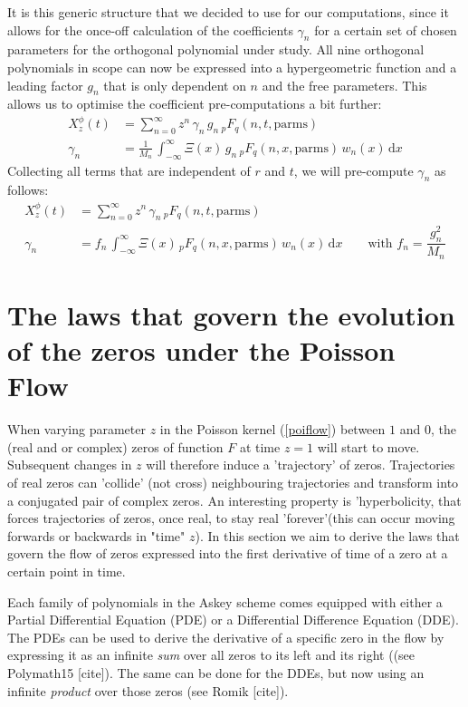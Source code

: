 \documentclass[a4paper,11pt,twoside]{amsart}
\begin{document}
It is this generic structure that we decided to use for our computations, since it allows for the once-off calculation of the coefficients $\gamma_n$ for a certain set of chosen parameters for the orthogonal polynomial under study. All nine orthogonal polynomials in scope can now be expressed into a hypergeometric function and a leading factor $g_n$ that is only dependent on $n$ and the free parameters. This allows us to optimise the coefficient pre-computations a bit further:
\begin{align}
 X^\phi_z(t) &= \sum_{n=0}^\infty z^n\,\gamma_n\,g_n\,{}_pF_q(n,t,\text{parms})\\
 \gamma_n &=  \frac{1}{M_n}\,\int_{-\infty}^\infty \Xi(x)\, g_n\,{}_pF_q(n,x, \text{parms})\,w_n(x) \,\mathrm{d}x
\end{align} 
Collecting all terms that are independent of $r$ and $t$, we will pre-compute $\gamma_n$ as follows:
\begin{align}
 X^\phi_z(t) &= \sum_{n=0}^\infty z^n\,\gamma_n\,{}_pF_q(n,t, \text{parms}) \\
 \gamma_n &=  f_n\,\int_{-\infty}^\infty \Xi(x)\,{}_pF_q(n,x,\text{parms})\,w_n(x) \,\mathrm{d}x \qquad \text{with } f_n = \dfrac{g_n^2}{M_n} 
\end{align} 
\pagebreak

\section{The laws that govern the evolution of the zeros under the Poisson Flow} \label{lawspoissonflow}
When varying parameter $z$ in the Poisson kernel (\ref{poiflow}) between $1$ and $0$, the (real and or complex) zeros of function $F$ at time $z=1$ will start to move. Subsequent changes in $z$ will therefore induce a 'trajectory' of zeros. Trajectories of real zeros can 'collide' (not cross) neighbouring trajectories and transform  into a conjugated pair of complex zeros. An interesting property is 'hyperbolicity, that forces trajectories of zeros, once real, to stay real 'forever'(this can occur moving forwards or backwards in "time" $z$). In this section we aim to derive the laws that govern the flow of zeros expressed into the first derivative of time of a zero at a certain point in time. 

Each family of polynomials in the Askey scheme comes equipped with either a Partial Differential Equation (PDE) or a Differential Difference Equation (DDE). The PDEs can be used to derive the derivative of a specific zero in the flow by expressing it as an infinite \textit{sum} over all zeros to its left and its right ((see Polymath15 [cite]). The same can be done for the DDEs, but now using an infinite \textit{product} over those zeros (see Romik [cite]). 
\end{document}

